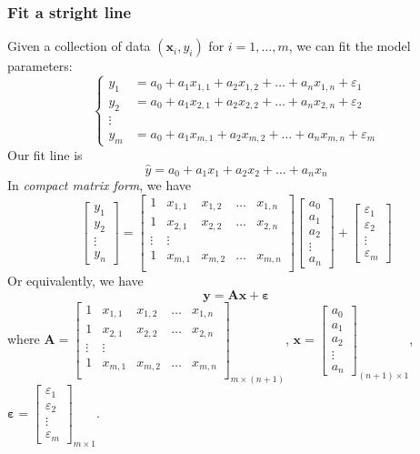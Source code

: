 \subsubsection{Fit a stright line}
Given a collection of data $(\bm x_i,y_i)$ for $i=1,\dots,m$, we can fit the model parameters:
\[
\left\{
\begin{aligned}
y_1&=a_0+a_1x_{1,1}+a_2x_{1,2}+\dots+a_nx_{1,n}+\varepsilon_1\\
y_2&=a_0+a_1x_{2,1}+a_2x_{2,2}+\dots+a_nx_{2,n}+\varepsilon_2\\
\vdots\\
y_m&=a_0+a_1x_{m,1}+a_2x_{m,2}+\dots+a_nx_{m,n}+\varepsilon_m
\end{aligned}
\right.
\]
Our fit line is 
\[
\hat y=a_0+a_1x_1+a_2x_2+\dots+a_nx_n
\]
In \textit{compact matrix form}, we have
\[
\begin{bmatrix}
y_1\\y_2\\\vdots\\y_n
\end{bmatrix}
=\begin{bmatrix}
1&x_{1,1}&x_{1,2}&\dots&x_{1,n}\\
1&x_{2,1}&x_{2,2}&\dots&x_{2,n}\\
\vdots&\vdots&&&\\
1&x_{m,1}&x_{m,2}&\dots&x_{m,n}\\
\end{bmatrix}\begin{bmatrix}
a_0\\a_1\\a_2\\\vdots\\a_{n}
\end{bmatrix}+\begin{bmatrix}
\varepsilon_1\\\varepsilon_2\\\vdots\\\varepsilon_m
\end{bmatrix}
\]
Or equivalently, we have 
\[
\bm y=\bm{Ax}+\bm \varepsilon
\]
where $\bm A =\begin{bmatrix}
1&x_{1,1}&x_{1,2}&\dots&x_{1,n}\\
1&x_{2,1}&x_{2,2}&\dots&x_{2,n}\\
\vdots&\vdots&&&\\
1&x_{m,1}&x_{m,2}&\dots&x_{m,n}\\
\end{bmatrix}_{m\times (n+1)}$, $\bm x=\begin{bmatrix}
a_0\\a_1\\a_2\\\vdots\\a_{n}
\end{bmatrix}_{(n+1)\times 1}$, $\bm \varepsilon=\begin{bmatrix}
\varepsilon_1\\\varepsilon_2\\\vdots\\\varepsilon_m
\end{bmatrix}_{m\times 1}$.\\
